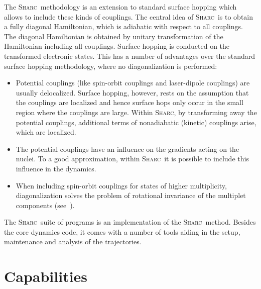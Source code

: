 \documentclass[a4paper,10pt,DIV=15,openany,twoside=false]{scrbook}
\newcommand{\sharc}{\textsc{Sharc}}
\begin{document}
The \sharc\ methodology is an extension to standard surface hopping which allows to include these kinds of couplings. The central idea of \sharc\ is to obtain a fully diagonal Hamiltonian, which is adiabatic with respect to all couplings. The diagonal Hamiltonian is obtained by unitary transformation of the Hamiltonian including all couplings. Surface hopping is conducted on the transformed electronic states.
This has a number of advantages over the standard surface hopping methodology, where no diagonalization is performed:
\begin{itemize}
  \item Potential couplings (like spin-orbit couplings and laser-dipole couplings) are usually delocalized. Surface hopping, however, rests on the assumption that the couplings are localized and hence surface hops only occur in the small region where the couplings are large. Within \sharc, by transforming away the potential couplings, additional terms of nonadiabatic (kinetic) couplings arise, which are localized. 
  \item The potential couplings have an influence on the gradients acting on the nuclei. To a good approximation, within \sharc\ it is possible to include this influence in the dynamics.
  \item When including spin-orbit couplings for states of higher multiplicity, diagonalization solves the problem of rotational invariance of the multiplet components (see~\cite{Granucci2012JCP}). 
\end{itemize}

The \sharc\ suite of programs is an implementation of the \sharc\ method. Besides the core dynamics code, it comes with a number of tools aiding in the setup, maintenance and analysis of the trajectories. 

\section{Capabilities}
\end{document}
